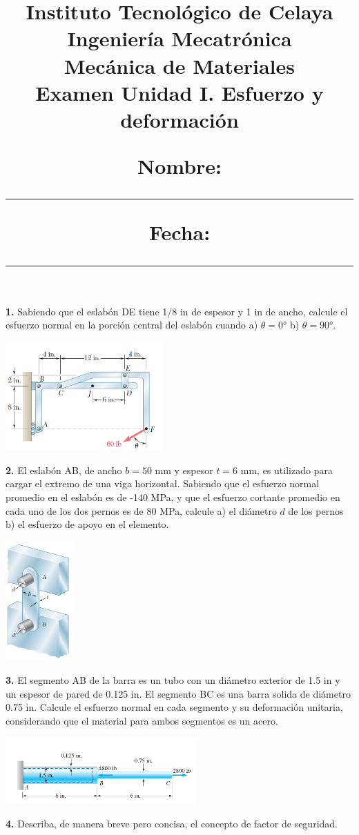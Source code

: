 \documentclass[12pt,letterpaper,twocolumn]{article}
\author{}
\date{}
\title{
\vspace{-20mm}
{\normalsize Instituto Tecnológico de Celaya} \\ [-3.5mm]
{\normalsize Ingeniería Mecatrónica} \\ [-3.5mm]
{\normalsize Mecánica de Materiales} \\ [-3.5mm]
{\bf\normalsize Examen Unidad I. Esfuerzo y deformación} \\ [2mm]
{\normalsize Nombre: \rule{8cm}{0.4pt} \hfill Fecha: \rule{3cm}{0.4pt} }
}
\newcommand{\puntos}[1]{ {\small\sffamily [#1 \%]} }
\begin{document}
\maketitle
\vspace{-20mm}

\textbf{1.}  Sabiendo que el eslabón DE tiene 1/8 in de espesor y 1 in de ancho, calcule el esfuerzo normal 
en la porción central del eslabón cuando a) $\theta=0$° b) $\theta=90$°.  \puntos{30} \\[-2mm]

\begin{center}
\includegraphics[width=0.45\textwidth]{img/p01.PNG}
\end{center}


\textbf{2.} El eslabón AB, de ancho $b=50\text{ mm}$  y espesor $t=6\text{ mm}$, es utilizado para 
cargar el extremo de una viga horizontal. Sabiendo que el esfuerzo normal promedio en el eslabón es 
de -140 MPa, y que el esfuerzo cortante promedio en cada uno de los dos pernos es de 80 MPa, calcule 
a) el diámetro $d$ de los pernos b) el esfuerzo de apoyo en el elemento. \puntos{30}

\begin{center}
\includegraphics[width=0.20\textwidth]{img/p02.PNG}
\end{center}

\textbf{3. } El segmento AB de la barra es un tubo con un diámetro exterior de 1.5 in y un espesor 
de pared de 0.125 in. El segmento BC es una barra solida de diámetro 0.75 in. Calcule el esfuerzo normal 
en cada segmento y su deformación unitaria, considerando que el material para ambos segmentos es un 
acero. \puntos{30}

\begin{center}
\includegraphics[width=0.55\textwidth]{img/p03.PNG}
\end{center}

\textbf{4. } Describa, de manera breve pero concisa, el concepto de factor de seguridad. \puntos{10}
\end{document}
